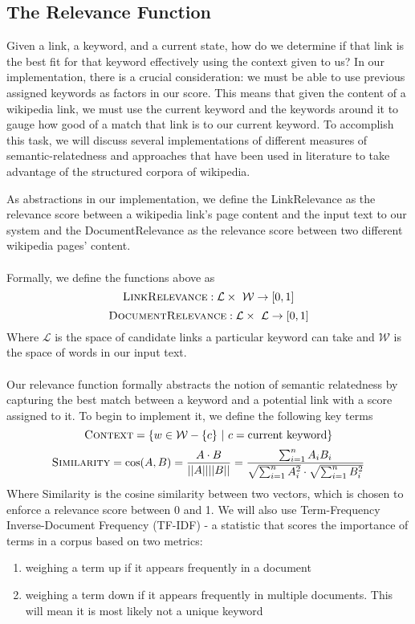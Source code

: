 \documentclass[twoside,11pt]{article}
\begin{document}
\subsection{The Relevance Function}
Given a link, a keyword, and a current state, how do we determine if that link is the best fit for that keyword effectively using the context given to us? In our implementation, there is a crucial consideration: we must be able to use previous assigned keywords as factors in our score. This means that given the content of a wikipedia link, we must use the current keyword and the keywords around it to gauge how good of a match that link is to our current keyword. To accomplish this task, we will discuss several implementations of different measures of semantic-relatedness and approaches that have been used in literature to take advantage of the structured corpora of wikipedia.

As abstractions in our implementation, we define the {\sc LinkRelevance} as the relevance score between a wikipedia link's page content and the input text to our system and the {\sc DocumentRelevance} as the relevance score between two different wikipedia pages' content.
\\ \\
Formally, we define the functions above as
$$\mbox{\sc LinkRelevance}: \mathcal{L} \times \ \mathcal{W}  \rightarrow [0, 1]$$
$$\mbox{\sc DocumentRelevance}: \mathcal{L} \times \ \mathcal{L}  \rightarrow [0, 1]$$
Where $\mathcal{L}$ is the space of candidate links a particular keyword can take and $\mathcal{W}$ is the space of words in our input text.
\\ \\
Our relevance function formally abstracts the notion of semantic relatedness by capturing the best match between a keyword and a potential link with a score assigned to it. To begin to implement it, we define the following key terms
$$\mbox{\sc Context} = \{w \in \mathcal{W} - \{c\} \ | \ c = \mbox{current keyword}\} $$
$$\mbox{\sc Similarity} = \cos(A, B) = \frac{A \cdot B}{||A|| ||B||} = \frac{\sum_{i=1}^{n} A_iB_i}{\sqrt{\sum_{i=1}^{n} A_i^2} \cdot \sqrt{\sum_{i=1}^{n} B_i^2}}$$
Where {\sc Similarity} is the cosine similarity between two vectors, which is chosen to enforce a relevance score between 0 and 1. We will also use Term-Frequency Inverse-Document Frequency (TF-IDF) -  a statistic that scores the importance of terms in a corpus based on two metrics:

\begin{enumerate}
  \item weighing a term up if it appears frequently in a document
  \item weighing a term down if it appears frequently in multiple documents. This will mean it is most likely not a unique keyword
\end{enumerate}
\end{document}
